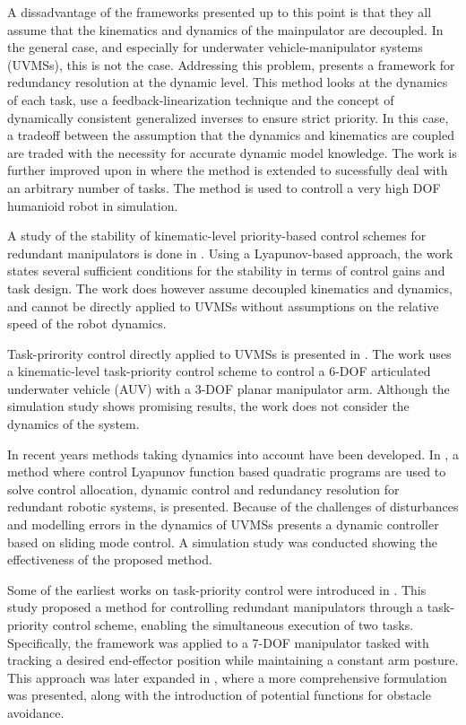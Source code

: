 A dissadvantage of the frameworks presented up to this point is that they all assume that
the kinematics and dynamics of the mainpulator are decoupled. In the general case,
and especially for underwater vehicle-manipulator systems (UVMSs), this is not the case.
Addressing this problem, \cite{khatib1987} presents a framework for redundancy resolution
at the dynamic level. This method looks at the dynamics of each task, use a feedback-linearization
technique and the concept of dynamically consistent generalized inverses \cite{khatib1995} to ensure
strict priority. In this case, a tradeoff between the assumption that the dynamics and
kinematics are coupled are traded with the necessity for accurate dynamic model knowledge.
The work is further improved upon in \cite{khatib2004} where the method is extended to
sucessfully deal with an arbitrary number of tasks. The method is used
to controll a very high DOF humanioid robot in simulation.

A study of the stability of kinematic-level priority-based control schemes for
redundant manipulators is done in \cite{antonelli2009}. Using a Lyapunov-based
approach, the work states several
sufficient conditions for the stability in terms of control gains and task design.
The work does however assume decoupled kinematics and dynamics, and cannot be 
directly applied to UVMSs without assumptions on the relative speed of the robot dynamics.

Task-prirority control directly applied to UVMSs is presented in \cite{antonelli1998}.
The work uses a kinematic-level task-priority control scheme to control a 6-DOF
articulated underwater vehicle (AUV) with a 3-DOF planar manipulator arm. Although
the simulation study shows promising results, the work does not consider the dynamics
of the system.

In recent years methods taking dynamics into account have been developed. In \cite{basso2020},
a method where control Lyapunov function based quadratic programs are used to solve
control allocation, dynamic control and redundancy resolution for redundant robotic systems,
is presented. Because of the challenges of disturbances and modelling errors in the dynamics of UVMSs \cite{iversflaten2022}
presents a dynamic controller based on sliding mode control. A simulation study was
conducted showing the effectiveness of the proposed method.
\fi

Some of the earliest works on task-priority control were introduced in \cite{hanafusa1981}. This study proposed a method for controlling redundant manipulators through a task-priority control scheme, enabling the simultaneous execution of two tasks. Specifically, the framework was applied to a 7-DOF manipulator tasked with tracking a desired end-effector position while maintaining a constant arm posture. This approach was later expanded in \cite{nakamura1987}, where a more comprehensive formulation was presented, along with the introduction of potential functions for obstacle avoidance.

